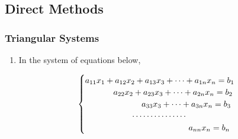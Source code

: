 \documentclass[10pt,compress,handout,ignorenonframetext]{beamer}
\begin{document}
\subsection{Direct Methods}
\begin{frame}
  \frametitle{Triangular Systems} 
  \begin{enumerate}
    \item <1-> In the system of equations below,
       {
         \begin{displaymath}
            \begin{cases}
              a_{11}x_{1}  + a_{12} x_{2} + a_{13} x_{3} + \cdots + a_{1n} x_{n} = b_{1} \\
           \hspace{1.2cm}   a_{22} x_{2} + a_{23} x_{3} + \cdots + a_{2n} x_{n} = b_{2} \\
           \hspace{2.4cm}                 a_{33} x_{3} + \cdots + a_{3n} x_{n} = b_{3} \\
           \hspace{2cm}       \cdots \cdots \cdots \cdots \cdots \\
           \hspace{4.4cm}                                        a_{nn} x_{n} = b_{n}         
            \end{cases}
         \end{displaymath}

}
\end{enumerate}
\end{frame}
\end{document}
